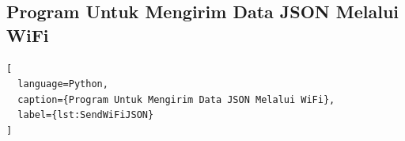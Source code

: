 \subsection{Program Untuk Mengirim Data JSON Melalui WiFi}

\begin{lstlisting}[
  language=Python,
  caption={Program Untuk Mengirim Data JSON Melalui WiFi},
  label={lst:SendWiFiJSON}
]

\end{lstlisting}

